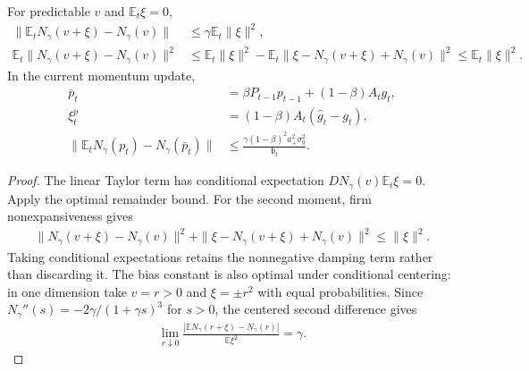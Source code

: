 \begin{corollary}
For predictable $v$ and $\mathbb E_t\xi=0$,
\begin{align}
 \|\mathbb E_tN_\gamma(v+\xi)-N_\gamma(v)\|
 &\le\gamma\mathbb E_t\|\xi\|^2,\\
 \mathbb E_t\|N_\gamma(v+\xi)-N_\gamma(v)\|^2
 &\le\mathbb E_t\|\xi\|^2
 -\mathbb E_t\|\xi-N_\gamma(v+\xi)+N_\gamma(v)\|^2
 \le\mathbb E_t\|\xi\|^2.
\end{align}
In the current momentum update,
\begin{align}
 \bar p_t&=\beta P_{t-1}p_{t-1}+(1-\beta)A_tg_t,\\
 \xi_t^p&=(1-\beta)A_t(\widehat g_t-g_t),\\
 \|\mathbb E_tN_\gamma(p_t)-N_\gamma(\bar p_t)\|
 &\le\frac{\gamma(1-\beta)^2a_+^2\sigma_q^2}{\mathfrak b_t}.
\end{align}
\end{corollary}
\begin{proof}
The linear Taylor term has conditional expectation $DN_\gamma(v)\mathbb E_t\xi=0$. Apply the optimal remainder bound. For the second moment, firm nonexpansiveness gives
\begin{align}
 \|N_\gamma(v+\xi)-N_\gamma(v)\|^2
 +\|\xi-N_\gamma(v+\xi)+N_\gamma(v)\|^2\le\|\xi\|^2.
\end{align}
Taking conditional expectations retains the nonnegative damping term rather than discarding it.
The bias constant is also optimal under conditional centering: in one dimension take $v=r>0$ and $\xi=\pm r^2$ with equal probabilities. Since $N_\gamma''(s)=-2\gamma/(1+\gamma s)^3$ for $s>0$, the centered second difference gives
\begin{align}
 \lim_{r\downarrow0}
 \frac{|\mathbb E N_\gamma(r+\xi)-N_\gamma(r)|}{\mathbb E\xi^2}=\gamma.
\end{align}
\end{proof}
